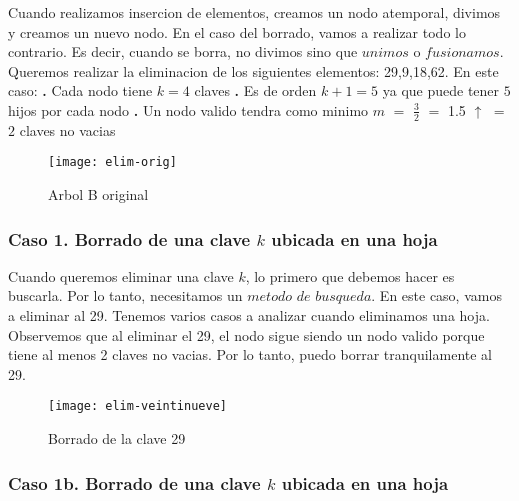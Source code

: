 \documentclass[10pt,a4paper]{article}
\begin{document}
Cuando realizamos insercion de elementos, creamos un nodo atemporal, divimos y creamos un nuevo nodo. En el caso del borrado, vamos a realizar todo lo contrario. Es decir, cuando se borra, no divimos sino que $unimos$ o $fusionamos$. Queremos realizar la eliminacion de los siguientes elementos: 29,9,18,62.
\newline
\newline
En este caso:
\newline
\newline
\textbf{.} Cada nodo tiene $k = 4$ claves
\newline
\newline
\textbf{.} Es de orden $k+1 = 5$ ya que puede tener $5$ hijos por cada nodo
\newline
\newline
\textbf{.} Un nodo valido tendra como minimo $m$ $=$ $\displaystyle \frac{3}{2}$ $=$ 1.5 $\uparrow$ $=$ $2$ claves no vacias

\begin{figure}[h]
\centering
\texttt{[image: elim-orig]}
\caption{Arbol B original}
\label{drivers1}
\end{figure}

\subsubsection{Caso 1. Borrado de una clave $k$ ubicada en una hoja}

Cuando queremos eliminar una clave $k$, lo primero que debemos hacer es buscarla. Por lo tanto, necesitamos un $metodo$ $de$ $busqueda$.
\newline
\newline
En este caso, vamos a eliminar al 29. Tenemos varios casos a analizar cuando eliminamos una hoja. Observemos que al eliminar el 29, el nodo sigue siendo un nodo valido porque tiene al menos 2 claves no vacias. Por lo tanto, puedo borrar tranquilamente al 29.  

\begin{figure}[h]
\centering
\texttt{[image: elim-veintinueve]}
\caption{Borrado de la clave 29}
\label{drivers1}
\end{figure}
\newpage

\subsubsection{Caso 1b. Borrado de una clave $k$ ubicada en una hoja}
\end{document}
